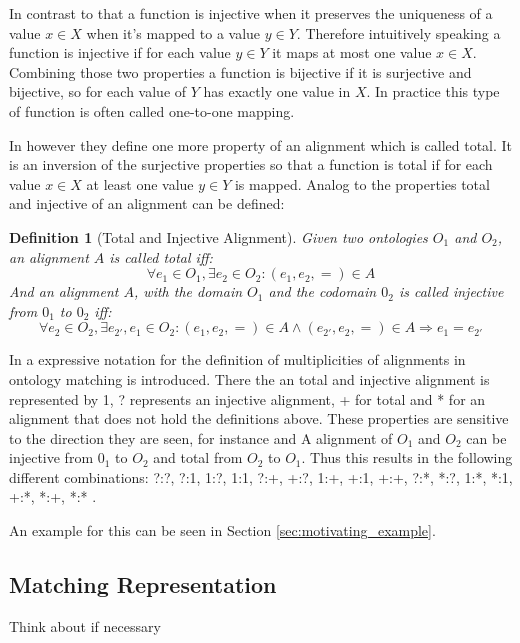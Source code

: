 \documentclass[11pt,titlepage,oneside,openany,a4paper]{report}
\newtheorem{definition}{Definition}[chapter]
\begin{document}
In contrast to that a function is injective when it preserves the uniqueness of a value $x \in X$ when it's mapped to a value $y \in Y$. Therefore intuitively speaking a function is injective if for each value $y \in Y$ it maps at most one value $x \in X$.
Combining those two properties a function is bijective if it is surjective and bijective, so for each value of $Y$ has exactly one value in $X$. In practice this type of function is often called one-to-one mapping.

In \cite{euzenat2013d} however they define one more property of an alignment which is called total. It is an inversion of the surjective properties so that a function is total if for each value $x \in X$ at least one value $y \in Y$ is mapped.
Analog to \cite{euzenat2013d} the properties total and injective of an alignment can be defined:
\begin{definition} [Total and Injective Alignment]
Given two ontologies $O_1$ and $O_2$, an alignment $A$ is called total iff:
\begin{equation*}
\forall e_1 \in O_1, \exists e_2 \in O_2 : (e_1,e_2,=) \in A
\end{equation*}
And an alignment $A$, with the domain $O_1$ and the codomain $0_2$ is called injective from $0_1$ to $0_2$ iff:
\begin{equation*}
\forall e_2 \in O_2 , \exists e_{2'},e_1 \in O_2 : (e_1,e_2,=) \in A \wedge (e_{2'},e_2,=) \in A \Rightarrow e_1 = e_{2'}
\end{equation*}
\end{definition}

In \cite{euzenat2003towards} a expressive notation for the definition of multiplicities of alignments in ontology matching is introduced. There the an total and injective alignment is represented by 1, ? represents an injective alignment, + for total and * for an alignment that does not hold the definitions above. These properties are sensitive to the direction they are seen, for instance and A alignment of $O_1$ and $O_2$ can be injective from $0_1$ to $O_2$ and total from $O_2$ to $O_1$. Thus this results in the following different combinations: ?:?, ?:1, 1:?, 1:1, ?:+, +:?, 1:+, +:1, +:+, ?:*, *:?, 1:*, *:1, +:*, *:+, *:* .

An example for this can be seen in Section \ref{sec:motivating_example}.
\subsection{Matching Representation}
\begin{LARGE}
Think about if necessary
\end{LARGE}
\end{document}
